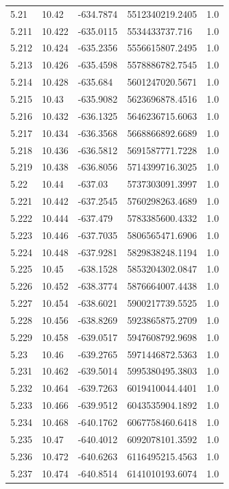 \begin{tabular}{lllll}
5.21 & 10.42 & -634.7874 & 5512340219.2405 & 1.0 \\
5.211 & 10.422 & -635.0115 & 5534433737.716 & 1.0 \\
5.212 & 10.424 & -635.2356 & 5556615807.2495 & 1.0 \\
5.213 & 10.426 & -635.4598 & 5578886782.7545 & 1.0 \\
5.214 & 10.428 & -635.684 & 5601247020.5671 & 1.0 \\
5.215 & 10.43 & -635.9082 & 5623696878.4516 & 1.0 \\
5.216 & 10.432 & -636.1325 & 5646236715.6063 & 1.0 \\
5.217 & 10.434 & -636.3568 & 5668866892.6689 & 1.0 \\
5.218 & 10.436 & -636.5812 & 5691587771.7228 & 1.0 \\
5.219 & 10.438 & -636.8056 & 5714399716.3025 & 1.0 \\
5.22 & 10.44 & -637.03 & 5737303091.3997 & 1.0 \\
5.221 & 10.442 & -637.2545 & 5760298263.4689 & 1.0 \\
5.222 & 10.444 & -637.479 & 5783385600.4332 & 1.0 \\
5.223 & 10.446 & -637.7035 & 5806565471.6906 & 1.0 \\
5.224 & 10.448 & -637.9281 & 5829838248.1194 & 1.0 \\
5.225 & 10.45 & -638.1528 & 5853204302.0847 & 1.0 \\
5.226 & 10.452 & -638.3774 & 5876664007.4438 & 1.0 \\
5.227 & 10.454 & -638.6021 & 5900217739.5525 & 1.0 \\
5.228 & 10.456 & -638.8269 & 5923865875.2709 & 1.0 \\
5.229 & 10.458 & -639.0517 & 5947608792.9698 & 1.0 \\
5.23 & 10.46 & -639.2765 & 5971446872.5363 & 1.0 \\
5.231 & 10.462 & -639.5014 & 5995380495.3803 & 1.0 \\
5.232 & 10.464 & -639.7263 & 6019410044.4401 & 1.0 \\
5.233 & 10.466 & -639.9512 & 6043535904.1892 & 1.0 \\
5.234 & 10.468 & -640.1762 & 6067758460.6418 & 1.0 \\
5.235 & 10.47 & -640.4012 & 6092078101.3592 & 1.0 \\
5.236 & 10.472 & -640.6263 & 6116495215.4563 & 1.0 \\
5.237 & 10.474 & -640.8514 & 6141010193.6074 & 1.0 \\

\end{tabular}
